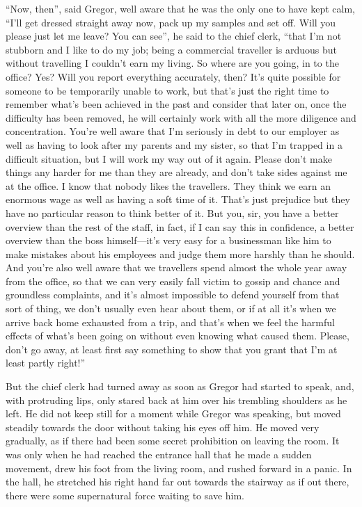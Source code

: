 “Now, then”, said Gregor, well aware that he was the only one to have
kept calm, “I’ll get dressed straight away now, pack up my samples and
set off. Will you please just let me leave? You can see”, he said to
the chief clerk, “that I’m not stubborn and I like to do my job; being
a commercial traveller is arduous but without travelling I couldn’t
earn my living. So where are you going, in to the office? Yes? Will you
report everything accurately, then? It’s quite possible for someone to
be temporarily unable to work, but that’s just the right time to
remember what’s been achieved in the past and consider that later on,
once the difficulty has been removed, he will certainly work with all
the more diligence and concentration. You’re well aware that I’m
seriously in debt to our employer as well as having to look after my
parents and my sister, so that I’m trapped in a difficult situation,
but I will work my way out of it again. Please don’t make things any
harder for me than they are already, and don’t take sides against me at
the office. I know that nobody likes the travellers. They think we earn
an enormous wage as well as having a soft time of it. That’s just
prejudice but they have no particular reason to think better of it. But
you, sir, you have a better overview than the rest of the staff, in
fact, if I can say this in confidence, a better overview than the boss
himself—it’s very easy for a businessman like him to make mistakes
about his employees and judge them more harshly than he should. And
you’re also well aware that we travellers spend almost the whole year
away from the office, so that we can very easily fall victim to gossip
and chance and groundless complaints, and it’s almost impossible to
defend yourself from that sort of thing, we don’t usually even hear
about them, or if at all it’s when we arrive back home exhausted from a
trip, and that’s when we feel the harmful effects of what’s been going
on without even knowing what caused them. Please, don’t go away, at
least first say something to show that you grant that I’m at least
partly right!”

But the chief clerk had turned away as soon as Gregor had started to
speak, and, with protruding lips, only stared back at him over his
trembling shoulders as he left. He did not keep still for a moment
while Gregor was speaking, but moved steadily towards the door without
taking his eyes off him. He moved very gradually, as if there had been
some secret prohibition on leaving the room. It was only when he had
reached the entrance hall that he made a sudden movement, drew his foot
from the living room, and rushed forward in a panic. In the hall, he
stretched his right hand far out towards the stairway as if out there,
there were some supernatural force waiting to save him.

